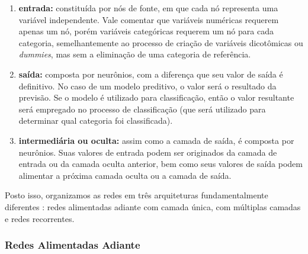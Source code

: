 \documentclass{automatextcc}
\newcommand{\bs}[1]{\boldsymbol{#1}}
\begin{document}
\begin{enumerate}
    \item \textbf{entrada:} constituída por nós de fonte, em que cada nó representa uma variável independente. Vale comentar que variáveis numéricas requerem apenas um nó, porém variáveis categóricas requerem um nó para cada categoria, semelhantemente ao processo de criação de variáveis dicotômicas ou \textit{dummies}, mas sem a eliminação de uma categoria de referência.
    \item \textbf{saída:} composta por neurônios, com a diferença que seu valor de saída é definitivo. No caso de um modelo preditivo, o valor será o resultado da previsão. Se o modelo é utilizado para classificação, então o valor resultante será empregado no processo de classificação (que será utilizado para determinar qual categoria foi classificada).
    \item \textbf{intermediária ou oculta:} assim como a camada de saída, é composta por neurônios. Suas valores de entrada podem ser originados da camada de entrada ou da camada oculta anterior, bem como seus valores de saída podem alimentar a próxima camada oculta ou a camada de saída.
\end{enumerate}
Posto isso, organizamos as redes em três arquiteturas fundamentalmente diferentes \citep{hair2005,haykin2009,hagan2014}: redes alimentadas adiante com camada única, com múltiplas camadas e redes recorrentes.


\subsubsection{Redes Alimentadas Adiante}


\end{document}
